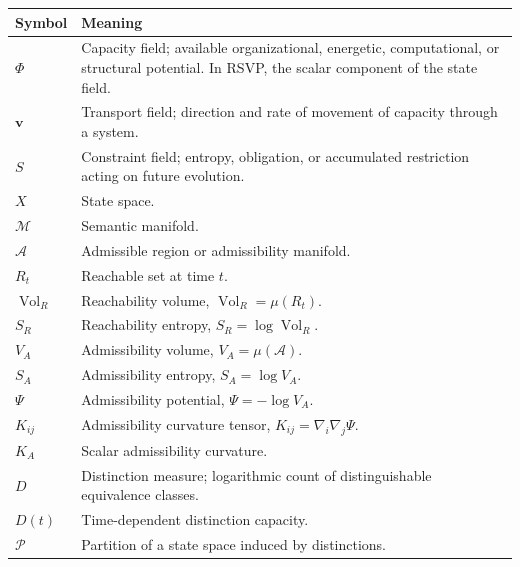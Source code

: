 \documentclass[12pt,twoside,openright]{book}
\newcommand{\partition}{\mathcal{P}}
\newcommand{\Vol}{\operatorname{Vol}}
\begin{document}
\begin{center}
\small
\begin{longtable}{p{3cm}p{10cm}}
\toprule
Symbol & Meaning \\
\midrule
\endhead

$\Phi$
&
Capacity field; available organizational, energetic,
computational, or structural potential. In RSVP,
the scalar component of the state field.
\\

$\mathbf v$
&
Transport field; direction and rate of movement of
capacity through a system.
\\

$S$
&
Constraint field; entropy, obligation, or accumulated
restriction acting on future evolution.
\\

$X$
&
State space.
\\

$\mathcal M$
&
Semantic manifold.
\\

$\mathcal A$
&
Admissible region or admissibility manifold.
\\

$R_t$
&
Reachable set at time $t$.
\\

$\Vol_R$
&
Reachability volume,
$\Vol_R=\mu(R_t)$.
\\

$S_R$
&
Reachability entropy,
$S_R=\log\Vol_R$.
\\

$V_A$
&
Admissibility volume,
$V_A=\mu(\mathcal A)$.
\\

$S_A$
&
Admissibility entropy,
$S_A=\log V_A$.
\\

$\Psi$
&
Admissibility potential,
$\Psi=-\log V_A$.
\\

$K_{ij}$
&
Admissibility curvature tensor,
$K_{ij}=\nabla_i\nabla_j\Psi$.
\\

$K_A$
&
Scalar admissibility curvature.
\\

$D$
&
Distinction measure; logarithmic count of
distinguishable equivalence classes.
\\

$D(t)$
&
Time-dependent distinction capacity.
\\

$\partition$
&
Partition of a state space induced by distinctions.
\\


\end{longtable}
\end{center}
\end{document}
